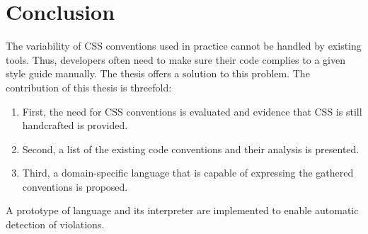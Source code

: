 \chapter{Conclusion}
\label{sec:conclusion}

The variability of CSS conventions used in practice cannot be handled by
existing tools. Thus, developers often need to make sure their code complies
to a given style guide manually. The thesis offers a solution to this problem.
The contribution of this thesis is threefold:

\begin{enumerate}
	\item First, the need for CSS conventions is evaluated and evidence
	that CSS is still handcrafted is provided.
	\item Second, a list of the existing code conventions and their analysis
	is presented.
	\item Third, a domain-specific language that is capable of expressing the
	gathered conventions is proposed.
\end{enumerate}

A prototype of language and its interpreter are implemented to enable
automatic detection of violations.
